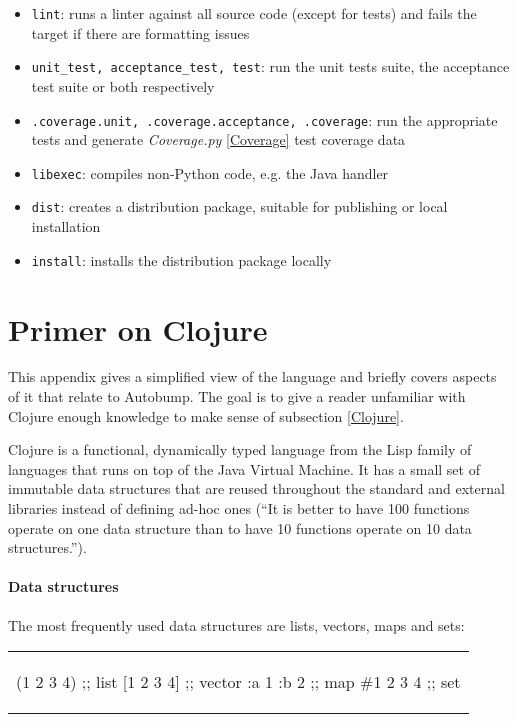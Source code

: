 \documentclass{l4proj}
\newcommand\genericstyle{\lstset{basicstyle=\ttm}}
\newcommand\codeinline[1]{{\genericstyle\lstinline!#1!}}
\begin{document}
\begin{appendices}
\begin{itemize}
\item \codeinline{lint}: runs a linter against all source code (except
for tests) and fails the target if there are formatting issues
\item \codeinline{unit_test, acceptance_test, test}: run the unit
tests suite, the acceptance test suite or both respectively
\item \codeinline{.coverage.unit, .coverage.acceptance, .coverage}:
run the appropriate tests and generate \textit{Coverage.py}
\ref{Coverage} test coverage data
\item \codeinline{libexec}: compiles non-Python code, e.g. the Java handler
\item \codeinline{dist}: creates a distribution package, suitable for
publishing or local installation
\item \codeinline{install}: installs the distribution package locally
\end{itemize}

\chapter{Primer on Clojure}
\label{ClojurePrimer}

This appendix gives a simplified view of the language and briefly
covers aspects of it that relate to Autobump. The goal is to give a
reader unfamiliar with Clojure enough knowledge to make sense of
subsection \ref{Clojure}.

Clojure is a functional, dynamically typed language from the Lisp
family of languages that runs on top of the Java Virtual Machine. It
has a small set of immutable data structures that are reused
throughout the standard and external libraries instead of defining
ad-hoc ones (``It is better to have 100 functions operate on one data
structure than to have 10 functions operate on 10 data
structures.''\cite{ClojureRationale}).

\subsubsection{Data structures}

The most frequently used data structures are lists, vectors, maps and
sets:

\begin{center}
\begin{tabular}{c}
\begin{clojure}
(1 2 3 4)    ;; list
[1 2 3 4]    ;; vector
{:a 1 :b 2}  ;; map
#{1 2 3 4}   ;; set
\end{clojure}
\end{tabular}
\end{center}


\end{appendices}
\end{document}
